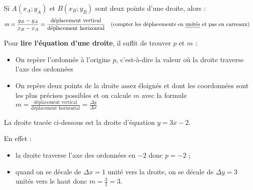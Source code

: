 \documentclass[a4paper,11pt]{article}
\begin{document}
\begin{cprop}
Si $A(x_A;y_A)$ et $B(x_B;y_B)$ sont deux points d'une droite, alors : \[m=\frac{y_B-y_A}{x_B-x_A}= \frac{\mbox{déplacement vertical}}{\mbox{déplacement horizontal}} \quad 	\mbox{(compter les déplacements en \emph{unités} et pas en carreaux)}\]
\end{cprop}

\begin{cmethode}
Pour \textbf{lire l'équation d'une droite}, il suffit de trouver $p$ et $m$ :
	\begin{itemize}
		\item On repère l'ordonnée à l'origine $p$, c'est-à-dire la valeur où la droite traverse l'axe des ordonnées
		\item On repère deux points de la droite assez éloignés et dont les coordonnées sont les plus précises possibles et on calcule $m$ avec la formule $m=\frac{\mbox{déplacement vertical}}{\mbox{déplacement horizontal}} = \frac{\Delta y}{\Delta x}$
\end{itemize}
\end{cmethode}

\begin{cexemple}
La droite tracée ci-dessous est la droite d'équation $y=3x-2$.

En effet :
\begin{itemize}[leftmargin=*]
	\item la droite traverse l'axe des ordonnées en $-2$ donc $p=-2$ ;
	\item quand on se décale de $\Delta x=1$ unité vers la droite, on se décale de $\Delta y=3$ unités vers le haut donc $m=\frac{3}{1}=3$.
\end{itemize} 
\end{cexemple}
\end{document}
